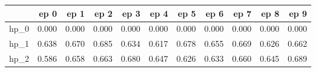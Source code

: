 \begin{tabular}{lrrrrrrrrrr}
\toprule
{} &   ep 0 &   ep 1 &   ep 2 &   ep 3 &   ep 4 &   ep 5 &   ep 6 &   ep 7 &   ep 8 &   ep 9 \\
\midrule
hp\_0 &  0.000 &  0.000 &  0.000 &  0.000 &  0.000 &  0.000 &  0.000 &  0.000 &  0.000 &  0.000 \\
hp\_1 &  0.638 &  0.670 &  0.685 &  0.634 &  0.617 &  0.678 &  0.655 &  0.669 &  0.626 &  0.662 \\
hp\_2 &  0.586 &  0.658 &  0.663 &  0.680 &  0.647 &  0.626 &  0.633 &  0.660 &  0.645 &  0.689 \\
\bottomrule
\end{tabular}
